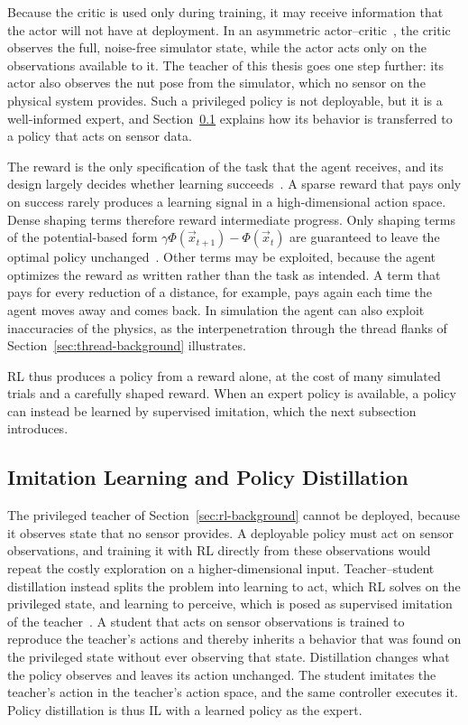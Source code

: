 Because the critic is used only during training, it may receive information that the actor will not have at deployment. In an asymmetric actor--critic~\cite{Pinto2017}, the critic observes the full, noise-free simulator state, while the actor acts only on the observations available to it. The teacher of this thesis goes one step further: its actor also observes the nut pose from the simulator, which no sensor on the physical system provides. Such a privileged policy is not deployable, but it is a well-informed expert, and Section~\ref{sec:il-background} explains how its behavior is transferred to a policy that acts on sensor data.

The reward is the only specification of the task that the agent receives, and its design largely decides whether learning succeeds~\cite{Kober2013}. A sparse reward that pays only on success rarely produces a learning signal in a high-dimensional action space. Dense shaping terms therefore reward intermediate progress. Only shaping terms of the potential-based form $\gamma\Phi(\vec{x}_{t+1})-\Phi(\vec{x}_t)$ are guaranteed to leave the optimal policy unchanged~\cite{Ng1999}. Other terms may be exploited, because the agent optimizes the reward as written rather than the task as intended. A term that pays for every reduction of a distance, for example, pays again each time the agent moves away and comes back. In simulation the agent can also exploit inaccuracies of the physics, as the interpenetration through the thread flanks of Section~\ref{sec:thread-background} illustrates.

\ac{RL} thus produces a policy from a reward alone, at the cost of many simulated trials and a carefully shaped reward. When an expert policy is available, a policy can instead be learned by supervised imitation, which the next subsection introduces.

\subsection{Imitation Learning and Policy Distillation}\label{sec:il-background}

The privileged teacher of Section~\ref{sec:rl-background} cannot be deployed, because it observes state that no sensor provides. A deployable policy must act on sensor observations, and training it with \ac{RL} directly from these observations would repeat the costly exploration on a higher-dimensional input. Teacher--student distillation instead splits the problem into learning to act, which \ac{RL} solves on the privileged state, and learning to perceive, which is posed as supervised imitation of the teacher~\cite{Chen2020,Lum2024}. A student that acts on sensor observations is trained to reproduce the teacher's actions and thereby inherits a behavior that was found on the privileged state without ever observing that state. Distillation changes what the policy observes and leaves its action unchanged. The student imitates the teacher's action in the teacher's action space, and the same controller executes it. Policy distillation is thus \ac{IL} with a learned policy as the expert.

